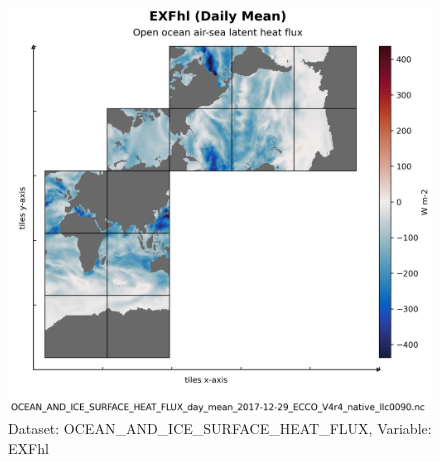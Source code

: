 \begin{figure}[H]
\centering
\includegraphics[scale=0.55]{../images/plots/native_plots/Ocean_and_Sea-Ice_Surface_Heat_Fluxes/EXFhl.png}
\caption{Dataset: OCEAN\_AND\_ICE\_SURFACE\_HEAT\_FLUX, Variable: EXFhl}
\label{tab:table-OCEAN_AND_ICE_SURFACE_HEAT_FLUX_EXFhl-Plot}
\end{figure}
\pagebreak
